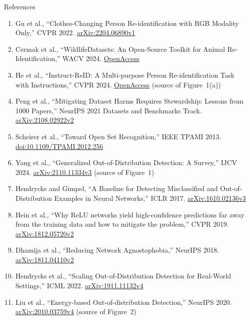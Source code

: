 \begin{frame}[allowframebreaks]{References}
\begin{enumerate}
    \item Gu et al., ``Clothes-Changing Person Re-identification with RGB Modality Only,'' CVPR 2022. \href{https://arxiv.org/abs/2204.06890v1}{arXiv:2204.06890v1}
    \item Cermak et al., ``WildlifeDatasets: An Open-Source Toolkit for Animal Re-Identification,'' WACV 2024. \href{https://openaccess.thecvf.com/content/WACV2024/html/Cermak_WildlifeDatasets_An_Open-Source_Toolkit_for_Animal_Re-Identification_WACV_2024_paper.html}{OpenAccess}
    \item He et al., ``Instruct-ReID: A Multi-purpose Person Re-identification Task with Instructions,'' CVPR 2024. \href{https://openaccess.thecvf.com/content/CVPR2024/html/He_Instruct-ReID_A_Multi-purpose_Person_Re-identification_Task_with_Instructions_CVPR_2024_paper.html}{OpenAccess} (source of Figure~1(a))
    \item Peng et al., ``Mitigating Dataset Harms Requires Stewardship: Lessons from 1000 Papers,'' NeurIPS 2021 Datasets and Benchmarks Track. \href{https://arxiv.org/abs/2108.02922v2}{arXiv:2108.02922v2}
    \item Scheirer et al., ``Toward Open Set Recognition,'' IEEE TPAMI 2013. \href{https://doi.org/10.1109/TPAMI.2012.256}{doi:10.1109/TPAMI.2012.256}
    \item Yang et al., ``Generalized Out-of-Distribution Detection: A Survey,'' IJCV 2024. \href{https://arxiv.org/abs/2110.11334v3}{arXiv:2110.11334v3} (source of Figure~1)
    \item Hendrycks and Gimpel, ``A Baseline for Detecting Misclassified and Out-of-Distribution Examples in Neural Networks,'' ICLR 2017. \href{https://arxiv.org/abs/1610.02136v3}{arXiv:1610.02136v3}
    \item Hein et al., ``Why ReLU networks yield high-confidence predictions far away from the training data and how to mitigate the problem,'' CVPR 2019. \href{https://arxiv.org/abs/1812.05720v2}{arXiv:1812.05720v2}
    \item Dhamija et al., ``Reducing Network Agnostophobia,'' NeurIPS 2018. \href{https://arxiv.org/abs/1811.04110v2}{arXiv:1811.04110v2}
    \item Hendrycks et al., ``Scaling Out-of-Distribution Detection for Real-World Settings,'' ICML 2022. \href{https://arxiv.org/abs/1911.11132v4}{arXiv:1911.11132v4}
    \item Liu et al., ``Energy-based Out-of-distribution Detection,'' NeurIPS 2020. \href{https://arxiv.org/abs/2010.03759v4}{arXiv:2010.03759v4} (source of Figure~2)

\end{enumerate}
\end{frame}
